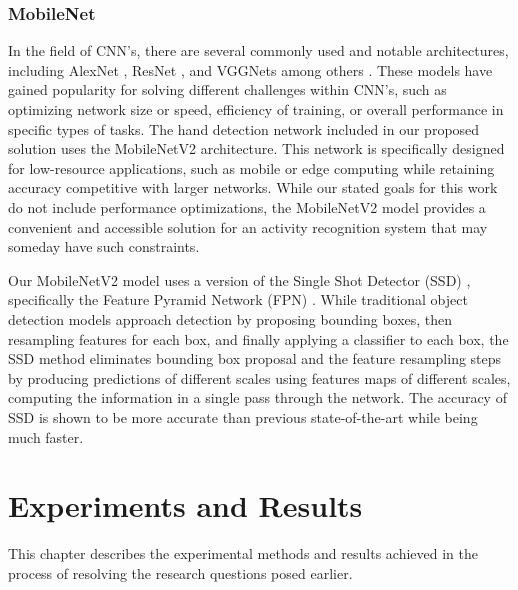 \documentclass[12pt]{report}
\begin{document}
\subsection{MobileNet}
In the field of CNN's, there are several commonly used and notable architectures, including AlexNet \cite{Krizhevsky2012ImagenetNetworks}, ResNet \cite{He2016DeepRecognition}, and VGGNets \cite{Simonyan2014VeryRecognition} among others \cite{Li2021AProspects}. These models have gained popularity for solving different challenges within CNN's, such as optimizing network size or speed, efficiency of training, or overall performance in specific types of tasks. The hand detection network included in our proposed solution uses the MobileNetV2 \cite{Sandler2018Mobilenetv2:Bottlenecks} architecture. This network is specifically designed for low-resource applications, such as mobile or edge computing while retaining accuracy competitive with larger networks. While our stated goals for this work do not include performance optimizations, the MobileNetV2 model provides a convenient and accessible solution for an activity recognition system that may someday have such constraints.

Our MobileNetV2 model uses a version of the Single Shot Detector (SSD) \cite{Liu2016Ssd:Detector}, specifically the Feature Pyramid Network (FPN) \cite{Lin2017FeatureDetection}. While traditional object detection models approach detection by proposing bounding boxes, then resampling features for each box, and finally applying a classifier to each box, the SSD method eliminates bounding box proposal and the feature resampling steps by producing predictions of different scales using features maps of different scales, computing the information in a single pass through the network. The accuracy of SSD is shown to be more accurate than previous state-of-the-art while being much faster.


\chapter{Experiments and Results}

This chapter describes the experimental methods and results achieved in the process of resolving the research questions posed earlier. 

\end{document}
